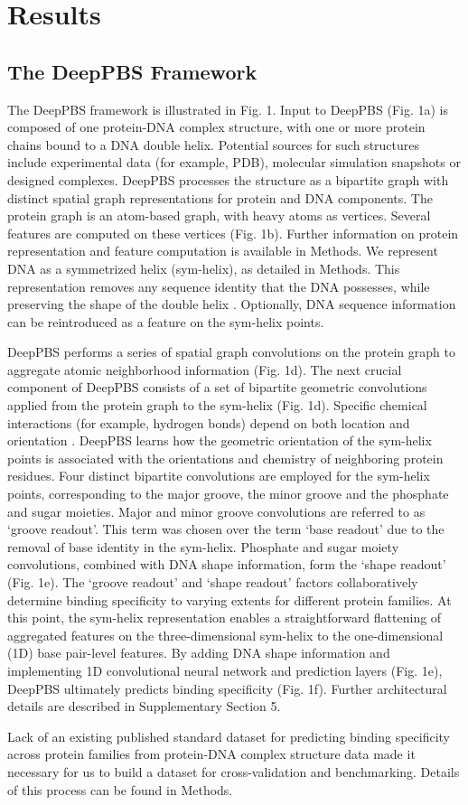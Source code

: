 \section{Results}
\subsection{The DeepPBS Framework}
The DeepPBS framework is illustrated in Fig. 1. Input to DeepPBS (Fig. 1a) is composed of one protein-DNA complex structure, with one or more protein chains bound to a DNA double helix. Potential sources for such structures include experimental data (for example, PDB\citep{berman2000protein}), molecular simulation snapshots or designed complexes. DeepPBS processes the structure as a bipartite graph with distinct spatial graph representations for protein and DNA components. The protein graph is an atom-based graph, with heavy atoms as vertices. Several features are computed on these vertices (Fig. 1b). Further information on protein representation and feature computation is available in Methods. We represent DNA as a symmetrized helix (sym-helix), as detailed in Methods. This representation removes any sequence identity that the DNA possesses, while preserving the shape of the double helix \citep{rohs2009role}. Optionally, DNA sequence information can be reintroduced as a feature on the sym-helix points.
\par
DeepPBS performs a series of spatial graph convolutions on the protein graph to aggregate atomic neighborhood information (Fig. 1d). The next crucial component of DeepPBS consists of a set of bipartite geometric convolutions applied from the protein graph to the sym-helix (Fig. 1d). Specific chemical interactions (for example, hydrogen bonds) depend on both location and orientation \citep{Helene1977}. DeepPBS learns how the geometric orientation of the sym-helix points is associated with the orientations and chemistry of neighboring protein residues. Four distinct bipartite convolutions are employed for the sym-helix points, corresponding to the major groove, the minor groove and the phosphate and sugar moieties. Major and minor groove convolutions are referred to as ‘groove readout’. This term was chosen over the term ‘base readout’ due to the removal of base identity in the sym-helix. Phosphate and sugar moiety convolutions, combined with DNA shape information, form the ‘shape readout’ (Fig. 1e). The ‘groove readout’ and ‘shape readout’ factors collaboratively determine binding specificity to varying extents for different protein families. At this point, the sym-helix representation enables a straightforward flattening of aggregated features on the three-dimensional sym-helix to the one-dimensional (1D) base pair-level features. By adding DNA shape information and implementing 1D convolutional neural network and prediction layers (Fig. 1e), DeepPBS ultimately predicts binding specificity (Fig. 1f). Further architectural details are described in Supplementary Section 5.
\par
Lack of an existing published standard dataset for predicting binding specificity across protein families from protein-DNA complex structure data made it necessary for us to build a dataset for cross-validation and benchmarking. Details of this process can be found in Methods.

